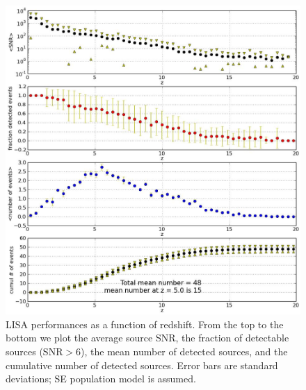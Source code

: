 \documentclass{iopart}
\begin{document}
\begin{figure}[H]
\center
   \includegraphics[width=1\textwidth]{FigSMBHPhenomAEI/LISA_mc_SNRs.eps}
\caption{LISA performances as a function of redshift. From the top to the bottom we plot the average source SNR, the fraction of detectable sources (SNR$>6$), the mean number of detected sources, and the cumulative number of detected sources. Error bars are standard deviations; SE population model is assumed.
\label{LISA_mc_SNR} } 
\end{figure}


\end{document}
